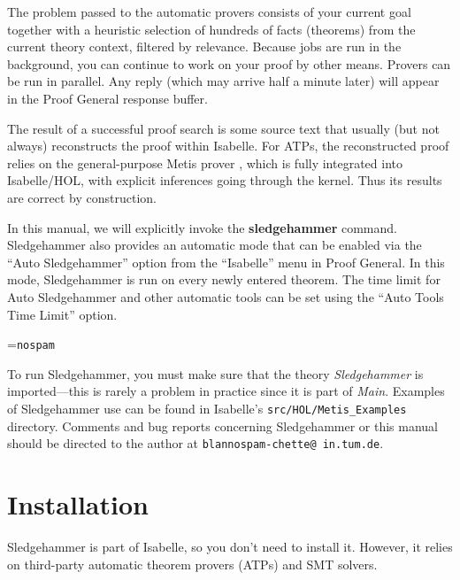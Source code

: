 \documentclass[a4paper,12pt]{article}
\begin{document}
The problem passed to the automatic provers consists of your current goal
together with a heuristic selection of hundreds of facts (theorems) from the
current theory context, filtered by relevance. Because jobs are run in the
background, you can continue to work on your proof by other means. Provers can
be run in parallel. Any reply (which may arrive half a minute later) will appear
in the Proof General response buffer.

The result of a successful proof search is some source text that usually (but
not always) reconstructs the proof within Isabelle. For ATPs, the reconstructed
proof relies on the general-purpose Metis prover \cite{metis}, which is fully
integrated into Isabelle/HOL, with explicit inferences going through the kernel.
Thus its results are correct by construction.

In this manual, we will explicitly invoke the \textbf{sledgehammer} command.
Sledgehammer also provides an automatic mode that can be enabled via the
``Auto Sledgehammer'' option from the ``Isabelle'' menu in Proof General. In
this mode, Sledgehammer is run on every newly entered theorem. The time limit
for Auto Sledgehammer and other automatic tools can be set using the ``Auto
Tools Time Limit'' option.

\newbox\boxA
\setbox\boxA=\hbox{\texttt{nospam}}

\newcommand\authoremail{\texttt{blan{\color{white}nospam}\kern-\wd\boxA{}chette@\allowbreak
in.\allowbreak tum.\allowbreak de}}

To run Sledgehammer, you must make sure that the theory \textit{Sledgehammer} is
imported---this is rarely a problem in practice since it is part of
\textit{Main}. Examples of Sledgehammer use can be found in Isabelle's
\texttt{src/HOL/Metis\_Examples} directory.
Comments and bug reports concerning Sledgehammer or this manual should be
directed to the author at \authoremail.

\smallskipamount


\section{Installation}
\label{installation}

Sledgehammer is part of Isabelle, so you don't need to install it. However, it
relies on third-party automatic theorem provers (ATPs) and SMT solvers.
\end{document}
